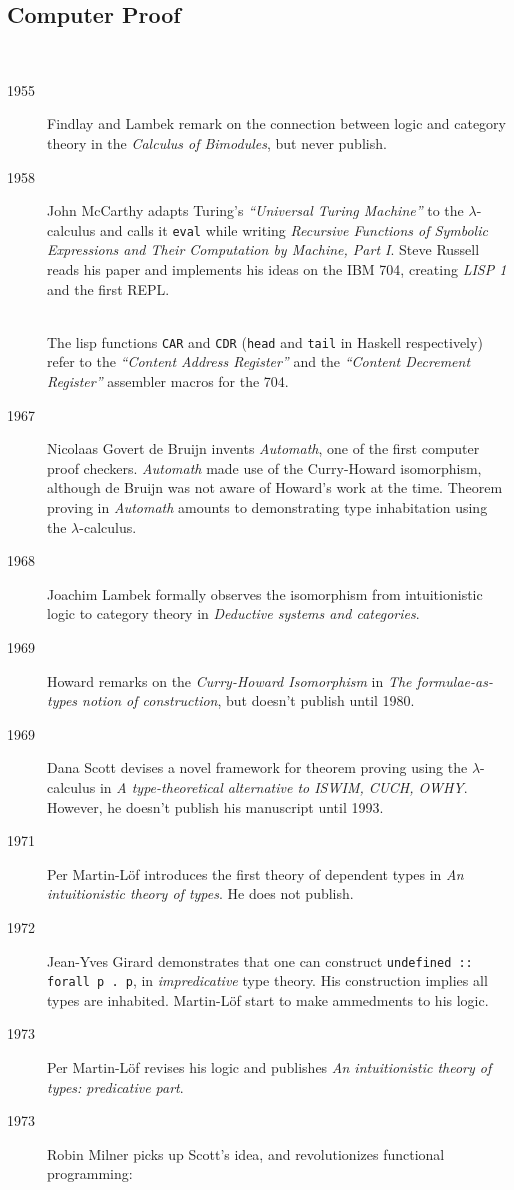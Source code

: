 \documentclass{beamer}
\begin{document}
\subsection{Computer Proof}
\begin{frame}[allowframebreaks]{\insertsectionhead\ \textemdash\
    \insertsubsectionhead}
  \begin{description}
  \item[1955] Findlay and Lambek remark on the connection between logic and category theory in the \emph{Calculus of Bimodules}, but never publish.
  \item[1958] John McCarthy adapts Turing's \emph{``Universal Turing
    Machine''} to the $\lambda$-calculus and calls it \texttt{eval}
  while writing \emph{Recursive Functions of Symbolic Expressions and
    Their Computation by Machine, Part I}. Steve Russell reads his
  paper and implements his ideas on the IBM 704, creating \emph{LISP
    1} and the first REPL.\\~\

  The lisp functions \texttt{CAR} and
  \texttt{CDR} (\lstinline{head} and \lstinline{tail} in Haskell respectively)
  refer to the \emph{``Content Address Register''} and the \emph{``Content Decrement Register''} assembler macros for the 704.
\item[1967] Nicolaas Govert de Bruijn invents \emph{Automath}, one of
  the first computer proof checkers.  \emph{Automath} made use of the
  Curry-Howard isomorphism, although de Bruijn was not aware of
  Howard's work at the time.  Theorem proving in \emph{Automath}
  amounts to demonstrating type inhabitation using the
  $\lambda$-calculus.
  \item[1968] Joachim Lambek formally observes the isomorphism from intuitionistic logic to category theory in \emph{Deductive systems and categories}.
  \item[1969] Howard remarks on the \emph{Curry-Howard Isomorphism} in \emph{The formulae-as-types notion of construction}, but doesn't publish until 1980.
  \item[1969] Dana Scott devises a novel framework for theorem proving
    using the $\lambda$-calculus in \emph{A type-theoretical
      alternative to ISWIM, CUCH, OWHY}. However, he doesn't publish
    his manuscript until 1993.
  \item[1971] Per Martin-L\"of introduces the first theory of dependent types in \emph{An intuitionistic theory of types}. He does not publish.
  \item[1972] Jean-Yves Girard demonstrates that one can construct \lstinline{undefined :: forall p . p}, in \emph{impredicative} type theory. His construction implies all types are inhabited.  Martin-L\"of start to make ammedments to his logic.
  \item[1973] Per Martin-L\"of revises his logic and publishes \emph{An intuitionistic theory of types: predicative part}.
  \item[1973] Robin Milner picks up Scott's idea, and revolutionizes functional programming:


\end{description}
\end{frame}
\end{document}

